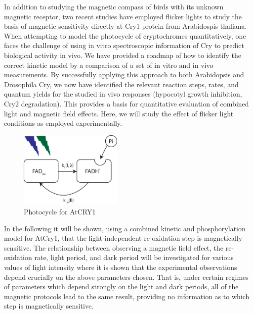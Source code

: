 \documentclass[twoside,twocolumn,9pt]{article}
\begin{document}
In addition to studying the magnetic compass of birds with its unknown magnetic receptor, two recent studies have employed flicker lights to study the basis of magnetic sensitivity directly at Cry1 protein from Arabidospis thaliana. 
When attempting to model the photocycle of cryptochromes quantitatively, one faces the challenge of using in vitro spectroscopic information of Cry to predict biological activity in vivo. We have provided a roadmap of how to identify the correct kinetic model by a comparison of a set of in vitro and in vivo measurements. By successfully applying this approach to both Arabidopsis \cite{Procopio2016} and Drosophila Cry, \cite{Arthaut2017} we now have identified the relevant reaction steps, rates, and quantum yields for the studied in vivo responses (hypocotyl growth inhibition, Cry2 degradation). This provides a basis for quantitative evaluation of combined light and magnetic field effects. Here, we will study the effect of flicker light conditions as employed experimentally. \cite{Pooam2019, Wiltschko2014}
\begin{figure}[h]
	\centering
	\includegraphics[width = 5cm, keepaspectratio]{photocycleTwoState.pdf}
	\caption{Photocycle for AtCRY1}
	\label{fig:photocycle}
\end{figure}

In the following it will be shown, using a combined kinetic and phosphorylation model for AtCry1, that the light-independent re-oxidation step is magnetically sensitive. The relationship between observing a magnetic field effect, the re-oxidation rate, light period, and dark period will be investigated for various values of light intensity where it is shown that the experimental observations depend crucially on the above parameters chosen. That is, under certain regimes of parameters which depend strongly on the light and dark periods, all of the magnetic protocols lead to the same result, providing no information as to which step is magnetically sensitive.
\end{document}

